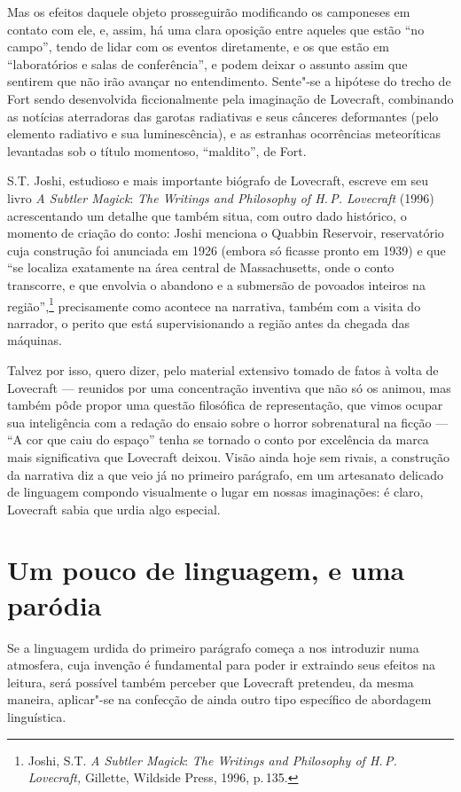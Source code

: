 Mas os efeitos daquele objeto prosseguirão modificando os camponeses em
contato com ele, e, assim, há uma clara oposição entre aqueles que estão
``no campo'', tendo de lidar com os eventos diretamente, e os que estão
em ``laboratórios e salas de conferência'', e podem deixar o assunto
assim que sentirem que não irão avançar no entendimento. Sente"-se a
hipótese do trecho de Fort sendo desenvolvida ficcionalmente pela
imaginação de Lovecraft, combinando as notícias aterradoras das garotas
radiativas e seus cânceres deformantes (pelo elemento radiativo e sua
luminescência), e as estranhas ocorrências meteoríticas levantadas sob o
título momentoso, ``maldito'', de Fort.

S.T. Joshi, estudioso e mais importante biógrafo de Lovecraft, escreve
em seu livro \emph{A Subtler Magick}: \emph{The Writings and Philosophy of H.\,P. Lovecraft} (1996)
acrescentando um detalhe que também situa, com outro dado histórico, o
momento de criação do conto: Joshi menciona o Quabbin Reservoir,
reservatório cuja construção foi anunciada em 1926 (embora só ficasse
pronto em 1939) e que ``se localiza exatamente na área central de
Massachusetts, onde o conto transcorre, e que envolvia o abandono e a
submersão de povoados inteiros na região'',\footnote{Joshi, S.T. \emph{A
  Subtler Magick}: \emph{The Writings and Philosophy of H.\,P. Lovecraft,}
  Gillette, Wildside Press, 1996, p.\,135.} precisamente como acontece na
narrativa, também com a visita do narrador, o perito que está
supervisionando a região antes da chegada das máquinas.

Talvez por isso, quero dizer, pelo material extensivo tomado de fatos à
volta de Lovecraft --- reunidos por uma concentração inventiva que não
só os animou, mas também pôde propor uma questão filosófica de
representação, que vimos ocupar sua inteligência com a redação do ensaio
sobre o horror sobrenatural na ficção --- ``A cor que caiu do espaço''
tenha se tornado o conto por excelência da marca mais significativa que
Lovecraft deixou. Visão ainda hoje sem rivais, a construção da narrativa
diz a que veio já no primeiro parágrafo, em um artesanato delicado de
linguagem compondo visualmente o lugar em nossas imaginações: é claro,
Lovecraft sabia que urdia algo especial.

\section*{Um pouco de linguagem, e uma paródia}

Se a linguagem urdida do primeiro parágrafo começa a nos introduzir numa
atmosfera, cuja invenção é fundamental para poder ir extraindo seus
efeitos na leitura, será possível também perceber que Lovecraft
pretendeu, da mesma maneira, aplicar"-se na confecção de ainda outro tipo
específico de abordagem linguística.

